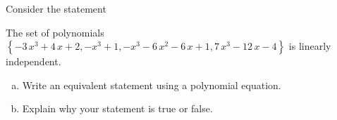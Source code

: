 
\begin{exerciseStatement}


Consider the statement 
\begin{center}\begin{minipage}{0.8\textwidth}
 The set of polynomials \( \left\{ -3 \, x^{3} + 4 \, x + 2 , -x^{3} + 1 , -x^{3} - 6 \, x^{2} - 6 \, x + 1 , 7 \, x^{3} - 12 \, x - 4 \right\} \) is linearly independent.
\end{minipage}\end{center}
    


\begin{enumerate}[(a)]
\item  Write an equivalent statement using a polynomial equation.
\item  Explain why your statement is true or false.
\end{enumerate}
    
\end{exerciseStatement}
    
